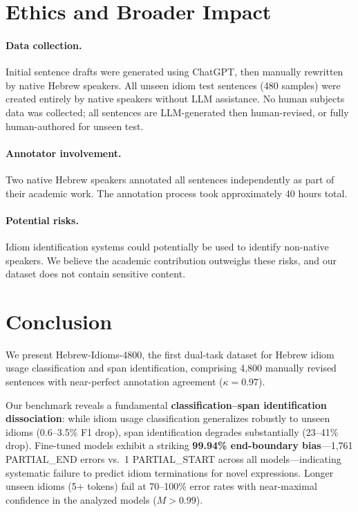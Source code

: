 \documentclass[11pt]{article}
\begin{document}
\section{Ethics and Broader Impact}

\paragraph{Data collection.}
Initial sentence drafts were generated using ChatGPT, then manually rewritten by native Hebrew speakers. All unseen idiom test sentences (480 samples) were created entirely by native speakers without LLM assistance. No human subjects data was collected; all sentences are LLM-generated then human-revised, or fully human-authored for unseen test.

\paragraph{Annotator involvement.}
Two native Hebrew speakers annotated all sentences independently as part of their academic work. The annotation process took approximately 40 hours total.

\paragraph{Potential risks.}
Idiom identification systems could potentially be used to identify non-native speakers. We believe the academic contribution outweighs these risks, and our dataset does not contain sensitive content.

\section{Conclusion}

We present Hebrew-Idioms-4800, the first dual-task dataset for Hebrew idiom usage classification and span identification, comprising 4,800 manually revised sentences with near-perfect annotation agreement ($\kappa = 0.97$).

Our benchmark reveals a fundamental \textbf{classification--span identification dissociation}: while idiom usage classification generalizes robustly to unseen idioms (0.6--3.5\% F1 drop), span identification degrades substantially (23--41\% drop). Fine-tuned models exhibit a striking \textbf{99.94\% end-boundary bias}---1,761 PARTIAL\_END errors vs.\ 1 PARTIAL\_START across all models---indicating systematic failure to predict idiom terminations for novel expressions. Longer unseen idioms (5+ tokens) fail at 70--100\% error rates with near-maximal confidence in the analyzed models ($M > 0.99$).
\end{document}
